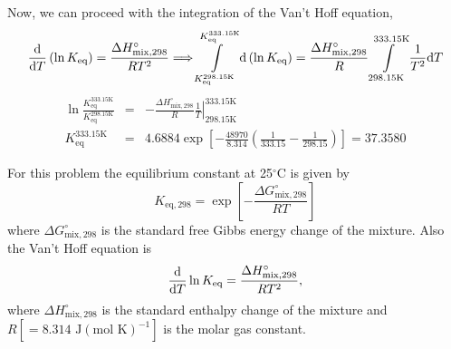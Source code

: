 \documentclass[calculator,steamtables,allquestions,datasheet,resit,solution]{exam_newMarcus2}
\newcommand{\frc}{\displaystyle\frac}
\renewcommand{\d}[1]{\mathrm{d} #1 }
\begin{document}
\begin{question}
\begin{enumerate}[(a)]
{\begin{displaymath}
          \end{displaymath}
           Now, we can proceed with the integration of the Van't Hoff equation,~
          \begin{displaymath} 
              \frc{\d}{\d T} \left(\ln{K_{\text{eq}}}\right) = \frc{\Delta H^{\circ}_{\text{mix},298}}{RT^{2}} \Longrightarrow \int\limits_{K_{\text{eq}}^{298.15\text{K}}}^{K_{\text{eq}}^{333.15\text{K}}} \d\left(\ln{K_{\text{eq}}}\right) = \frc{\Delta H^{\circ}_{\text{mix},298}}{R}\int\limits_{298.15\text{K}}^{333.15\text{K}}\frc{1}{T^{2}}\d T
          \end{displaymath}
          \begin{eqnarray}
              \ln{\frc{K_{\text{eq}}^{333.15\text{K}}}{K_{\text{eq}}^{298.15\text{K}}}} &=& -\frc{\Delta H^{\circ}_{\text{mix},298}}{R} \left.\frc{1}{T}\right|_{298.15\text{K}}^{333.15\text{K}} \nonumber \\
             K_{\text{eq}}^{333.15\text{K}} &=&  4.6884 \exp{ \left[-\frc{48970}{8.314}\left(\frc{1}{333.15} - \frc{1}{298.15}\right)\right] } = 37.3580 \nonumber 
           \end{eqnarray}

}
%
\end{enumerate}
        For this problem the equilibrium constant at 25$^{\circ}$C is given by
          \begin{displaymath}
              K_{\text{eq},298} = \exp{\left[-\frc{\Delta G^{\circ}_{\text{mix},298}}{R T}\right]}
          \end{displaymath}
          where $\Delta G^{\circ}_{\text{mix},298}$ is the standard free Gibbs energy change of the mixture. Also the Van't Hoff equation is
          \begin{displaymath}
               \frc{\d}{\d T} \ln{K_{\text{eq}}} = \frc{\Delta H^{\circ}_{\text{mix},298}}{RT^{2}},
          \end{displaymath}
          where $\Delta H^{\circ}_{\text{mix},298}$ is the standard enthalpy change of the mixture and $R\left[=\text{8.314 J}\left(\text{mol K}\right)^{-1}\right]$ is the molar gas constant.
%
\end{question}



\vfill
\paperend

\clearpage


\vfill 

{
  
  
}
\end{document}
